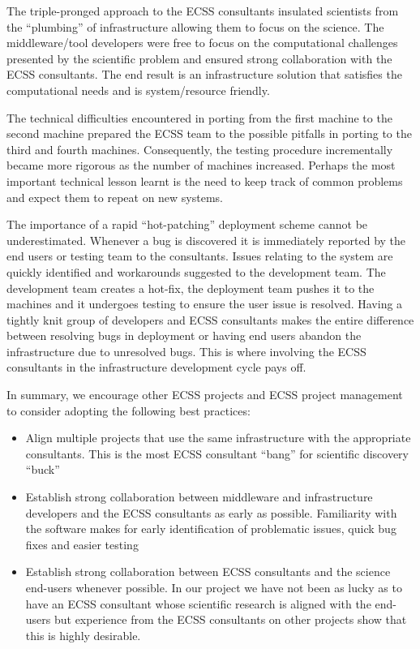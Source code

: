 \documentclass{sig-alternate}
\begin{document}
The triple-pronged approach to the ECSS consultants insulated scientists from
the ``plumbing'' of infrastructure allowing them to focus on the science. The
middleware/tool developers were free to focus on the computational challenges
presented by the scientific problem and ensured strong collaboration with the
ECSS consultants. The end result is an infrastructure solution that satisfies
the computational needs and is system/resource friendly.

The technical difficulties encountered in porting from the first
machine to the second machine prepared the ECSS team to the possible
pitfalls in porting to the third and fourth machines. Consequently,
the testing procedure incrementally became more rigorous as the number
of machines increased. Perhaps the most important technical lesson
learnt is the need to keep track of common problems and expect them to
repeat on new systems.

The importance of a rapid ``hot-patching'' deployment scheme cannot be
underestimated. Whenever a bug is discovered it is immediately
reported by the end users or testing team to the consultants. Issues
relating to the system are quickly identified and workarounds
suggested to the development team. The development team creates a
hot-fix, the deployment team pushes it to the machines and it
undergoes testing to ensure the user issue is resolved. Having a
tightly knit group of developers and ECSS consultants makes the entire
difference between resolving bugs in deployment or having end users
abandon the infrastructure due to unresolved bugs. This is where
involving the ECSS consultants in the infrastructure development cycle
pays off.

In summary, we encourage other ECSS projects and ECSS project
management to consider adopting the following best practices:
\begin{itemize}
 \item Align multiple projects that use the same infrastructure
 with the appropriate consultants. This is the most ECSS consultant
 ``bang'' for scientific discovery ``buck''
 \item Establish strong collaboration between middleware and infrastructure
 developers and the ECSS consultants as early as possible. Familiarity with the software makes for early
 identification of problematic issues, quick bug fixes and easier testing
 \item Establish strong collaboration between ECSS consultants and the science
 end-users whenever possible. In our project we have not been as lucky as to
 have an ECSS consultant whose scientific research is aligned with the end-users
 but experience from the ECSS consultants on other projects show that this is highly
 desirable.
\end{itemize}
\end{document}
